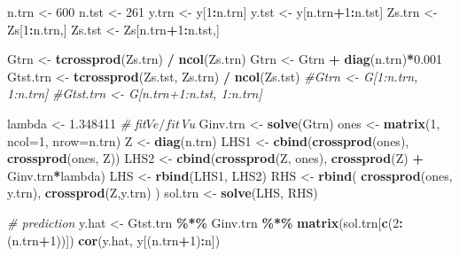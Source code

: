 \documentclass[
]{article}
\newenvironment{Shaded}{\begin{snugshade}}{\end{snugshade}}
\newcommand{\AttributeTok}[1]{\textcolor[rgb]{0.13,0.29,0.53}{#1}}
\newcommand{\CommentTok}[1]{\textcolor[rgb]{0.56,0.35,0.01}{\textit{#1}}}
\newcommand{\DecValTok}[1]{\textcolor[rgb]{0.00,0.00,0.81}{#1}}
\newcommand{\FloatTok}[1]{\textcolor[rgb]{0.00,0.00,0.81}{#1}}
\newcommand{\FunctionTok}[1]{\textcolor[rgb]{0.13,0.29,0.53}{\textbf{#1}}}
\newcommand{\NormalTok}[1]{#1}
\newcommand{\OtherTok}[1]{\textcolor[rgb]{0.56,0.35,0.01}{#1}}
\newcommand{\SpecialCharTok}[1]{\textcolor[rgb]{0.81,0.36,0.00}{\textbf{#1}}}
\begin{document}
\begin{Shaded}
\begin{Highlighting}[]
\NormalTok{n.trn }\OtherTok{\textless{}{-}} \DecValTok{600}
\NormalTok{n.tst }\OtherTok{\textless{}{-}} \DecValTok{261}
\NormalTok{y.trn }\OtherTok{\textless{}{-}}\NormalTok{ y[}\DecValTok{1}\SpecialCharTok{:}\NormalTok{n.trn]}
\NormalTok{y.tst }\OtherTok{\textless{}{-}}\NormalTok{ y[n.trn}\SpecialCharTok{+}\DecValTok{1}\SpecialCharTok{:}\NormalTok{n.tst]}
\NormalTok{Zs.trn }\OtherTok{\textless{}{-}}\NormalTok{ Zs[}\DecValTok{1}\SpecialCharTok{:}\NormalTok{n.trn,]}
\NormalTok{Zs.tst }\OtherTok{\textless{}{-}}\NormalTok{ Zs[n.trn}\SpecialCharTok{+}\DecValTok{1}\SpecialCharTok{:}\NormalTok{n.tst,]}

\NormalTok{Gtrn }\OtherTok{\textless{}{-}} \FunctionTok{tcrossprod}\NormalTok{(Zs.trn) }\SpecialCharTok{/} \FunctionTok{ncol}\NormalTok{(Zs.trn)}
\NormalTok{Gtrn }\OtherTok{\textless{}{-}}\NormalTok{ Gtrn }\SpecialCharTok{+} \FunctionTok{diag}\NormalTok{(n.trn)}\SpecialCharTok{*}\FloatTok{0.001}
\NormalTok{Gtst.trn }\OtherTok{\textless{}{-}} \FunctionTok{tcrossprod}\NormalTok{(Zs.tst, Zs.trn) }\SpecialCharTok{/} \FunctionTok{ncol}\NormalTok{(Zs.tst)}
\CommentTok{\#Gtrn \textless{}{-} G[1:n.trn, 1:n.trn]}
\CommentTok{\#Gtst.trn \textless{}{-} G[n.trn+1:n.tst, 1:n.trn]}

\NormalTok{lambda }\OtherTok{\textless{}{-}} \FloatTok{1.348411} \CommentTok{\# fit$Ve / fit$Vu}
\NormalTok{Ginv.trn }\OtherTok{\textless{}{-}} \FunctionTok{solve}\NormalTok{(Gtrn)}
\NormalTok{ones }\OtherTok{\textless{}{-}} \FunctionTok{matrix}\NormalTok{(}\DecValTok{1}\NormalTok{, }\AttributeTok{ncol=}\DecValTok{1}\NormalTok{, }\AttributeTok{nrow=}\NormalTok{n.trn)}
\NormalTok{Z }\OtherTok{\textless{}{-}} \FunctionTok{diag}\NormalTok{(n.trn)}
\NormalTok{LHS1 }\OtherTok{\textless{}{-}} \FunctionTok{cbind}\NormalTok{(}\FunctionTok{crossprod}\NormalTok{(ones), }\FunctionTok{crossprod}\NormalTok{(ones, Z)) }
\NormalTok{LHS2 }\OtherTok{\textless{}{-}} \FunctionTok{cbind}\NormalTok{(}\FunctionTok{crossprod}\NormalTok{(Z, ones), }\FunctionTok{crossprod}\NormalTok{(Z) }\SpecialCharTok{+}\NormalTok{  Ginv.trn}\SpecialCharTok{*}\NormalTok{lambda)}
\NormalTok{LHS }\OtherTok{\textless{}{-}} \FunctionTok{rbind}\NormalTok{(LHS1, LHS2)}
\NormalTok{RHS }\OtherTok{\textless{}{-}} \FunctionTok{rbind}\NormalTok{( }\FunctionTok{crossprod}\NormalTok{(ones, y.trn), }\FunctionTok{crossprod}\NormalTok{(Z,y.trn) )}
\NormalTok{sol.trn }\OtherTok{\textless{}{-}} \FunctionTok{solve}\NormalTok{(LHS, RHS)}

\CommentTok{\# prediction}
\NormalTok{y.hat }\OtherTok{\textless{}{-}}\NormalTok{ Gtst.trn }\SpecialCharTok{\%*\%}\NormalTok{ Ginv.trn }\SpecialCharTok{\%*\%} \FunctionTok{matrix}\NormalTok{(sol.trn[}\FunctionTok{c}\NormalTok{(}\DecValTok{2}\SpecialCharTok{:}\NormalTok{(n.trn}\SpecialCharTok{+}\DecValTok{1}\NormalTok{))])}
\FunctionTok{cor}\NormalTok{(y.hat, y[(n.trn}\SpecialCharTok{+}\DecValTok{1}\NormalTok{)}\SpecialCharTok{:}\NormalTok{n])}
\end{Highlighting}
\end{Shaded}
\end{document}

